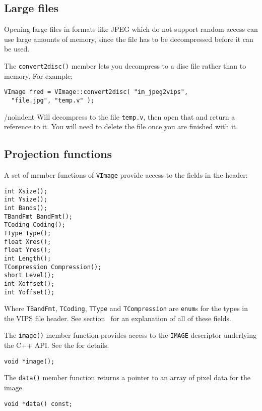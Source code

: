 \subsection{Large files}

Opening large files in formats like JPEG which do not support random access
can use large amounts of memory, since the file has to be decompressed before
it can be used.

The \verb+convert2disc()+ member lets you decompress to a disc file rather
than to memory. For example:

\begin{verbatim}
VImage fred = VImage::convert2disc( "im_jpeg2vips", 
  "file.jpg", "temp.v" );
\end{verbatim}

/noindent
Will decompress to the file \verb+temp.v+, then open that and return a
reference to it. You will need to delete the file once you are finished with
it.

\subsection{Projection functions}

A set of member functions of \verb+VImage+ provide access to the fields in
the header:

\begin{verbatim}
int Xsize();
int Ysize();
int Bands();
TBandFmt BandFmt();
TCoding Coding();
TType Type();
float Xres();
float Yres();
int Length();
TCompression Compression();
short Level();
int Xoffset();
int Yoffset();
\end{verbatim}

\noindent
Where \verb+TBandFmt+, \verb+TCoding+, \verb+TType+ and \verb+TCompression+
are \verb+enum+s for the types in the VIPS file header. See section~ for an explanation of all of these fields.

The \verb+image()+ member function provides access to the \verb+IMAGE+
descriptor underlying the C++ API. See the  for details.

\begin{verbatim}
void *image();
\end{verbatim}

The \verb+data()+ member function returns a pointer to an array of pixel data
for the image. 

\begin{verbatim}
void *data() const;
\end{verbatim}

